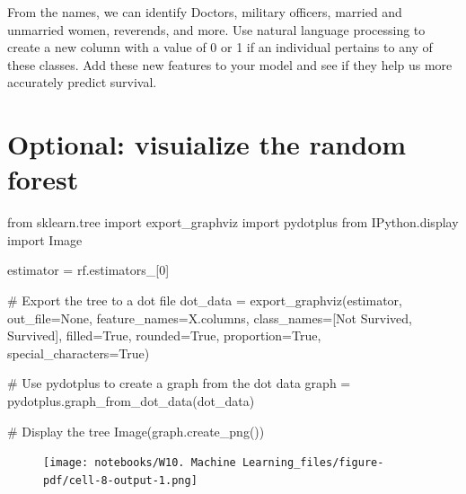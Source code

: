 \documentclass[
  letterpaper,
  DIV=11,
  numbers=noendperiod]{scrreprt}
\newenvironment{Shaded}{\begin{snugshade}}{\end{snugshade}}
\newcommand{\CommentTok}[1]{\textcolor[rgb]{0.37,0.37,0.37}{#1}}
\newcommand{\DecValTok}[1]{\textcolor[rgb]{0.68,0.00,0.00}{#1}}
\newcommand{\ImportTok}[1]{\textcolor[rgb]{0.00,0.46,0.62}{#1}}
\newcommand{\NormalTok}[1]{\textcolor[rgb]{0.00,0.23,0.31}{#1}}
\newcommand{\OperatorTok}[1]{\textcolor[rgb]{0.37,0.37,0.37}{#1}}
\newcommand{\StringTok}[1]{\textcolor[rgb]{0.13,0.47,0.30}{#1}}
\newcommand{\VariableTok}[1]{\textcolor[rgb]{0.07,0.07,0.07}{#1}}
\begin{document}
From the names, we can identify Doctors, military officers, married and
unmarried women, reverends, and more. Use natural language processing to
create a new column with a value of 0 or 1 if an individual pertains to
any of these classes. Add these new features to your model and see if
they help us more accurately predict survival.

\hypertarget{optional-visuialize-the-random-forest}{%
\section{Optional: visuialize the random
forest}\label{optional-visuialize-the-random-forest}}

\begin{Shaded}
\begin{Highlighting}[]
\ImportTok{from}\NormalTok{ sklearn.tree }\ImportTok{import}\NormalTok{ export\_graphviz}
\ImportTok{import}\NormalTok{ pydotplus}
\ImportTok{from}\NormalTok{ IPython.display }\ImportTok{import}\NormalTok{ Image}

\NormalTok{estimator }\OperatorTok{=}\NormalTok{ rf.estimators\_[}\DecValTok{0}\NormalTok{]}

\CommentTok{\# Export the tree to a dot file}
\NormalTok{dot\_data }\OperatorTok{=}\NormalTok{ export\_graphviz(estimator, out\_file}\OperatorTok{=}\VariableTok{None}\NormalTok{, }
\NormalTok{                           feature\_names}\OperatorTok{=}\NormalTok{X.columns,  }
\NormalTok{                           class\_names}\OperatorTok{=}\NormalTok{[}\StringTok{\textquotesingle{}Not Survived\textquotesingle{}}\NormalTok{, }\StringTok{\textquotesingle{}Survived\textquotesingle{}}\NormalTok{],  }
\NormalTok{                           filled}\OperatorTok{=}\VariableTok{True}\NormalTok{, rounded}\OperatorTok{=}\VariableTok{True}\NormalTok{,  proportion}\OperatorTok{=}\VariableTok{True}\NormalTok{,}
\NormalTok{                           special\_characters}\OperatorTok{=}\VariableTok{True}\NormalTok{)  }

\CommentTok{\# Use pydotplus to create a graph from the dot data}
\NormalTok{graph }\OperatorTok{=}\NormalTok{ pydotplus.graph\_from\_dot\_data(dot\_data)  }

\CommentTok{\# Display the tree}
\NormalTok{Image(graph.create\_png())}
\end{Highlighting}
\end{Shaded}

\begin{figure}[H]

{\centering \texttt{[image: notebooks/W10. Machine Learning\_files/figure-pdf/cell-8-output-1.png]}

}

\end{figure}
\end{document}
